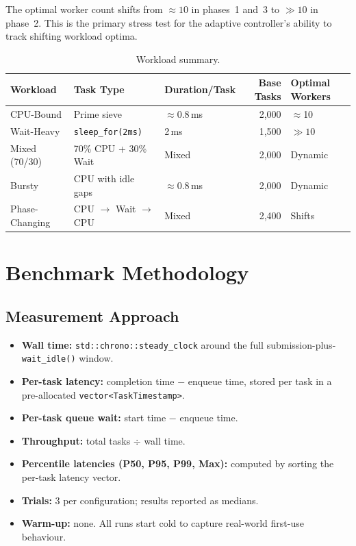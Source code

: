 \documentclass[12pt,a4paper]{article}
\begin{document}
The optimal worker count shifts from $\approx 10$ in phases~1 and~3 to
$\gg 10$ in phase~2.
This is the primary stress test for the adaptive controller's ability to
track shifting workload optima.

\begin{table}[H]
\centering
\caption{Workload summary.}
\begin{tabular}{lllrl}
\toprule
\textbf{Workload} & \textbf{Task Type} & \textbf{Duration/Task}
  & \textbf{Base Tasks} & \textbf{Optimal Workers} \\
\midrule
CPU-Bound        & Prime sieve              & $\approx$0.8\,ms & 2,000 & $\approx$10 \\
Wait-Heavy       & \texttt{sleep\_for(2ms)} & 2\,ms            & 1,500 & $\gg 10$    \\
Mixed (70/30)    & 70\% CPU + 30\% Wait     & Mixed            & 2,000 & Dynamic     \\
Bursty           & CPU with idle gaps       & $\approx$0.8\,ms & 2,000 & Dynamic     \\
Phase-Changing   & CPU $\to$ Wait $\to$ CPU & Mixed            & 2,400 & Shifts      \\
\bottomrule
\end{tabular}
\label{tab:workloads}
\end{table}

\section{Benchmark Methodology}

\subsection{Measurement Approach}

\begin{itemize}
  \item \textbf{Wall time:} \texttt{std::chrono::steady\_clock} around the
        full submission-plus-\texttt{wait\_idle()} window.
  \item \textbf{Per-task latency:} completion time $-$ enqueue time, stored
        per task in a pre-allocated \texttt{vector<TaskTimestamp>}.
  \item \textbf{Per-task queue wait:} start time $-$ enqueue time.
  \item \textbf{Throughput:} total tasks $\div$ wall time.
  \item \textbf{Percentile latencies (P50, P95, P99, Max):} computed by
        sorting the per-task latency vector.
  \item \textbf{Trials:} 3 per configuration; results reported as medians.
  \item \textbf{Warm-up:} none.
        All runs start cold to capture real-world first-use behaviour.
\end{itemize}
\end{document}
